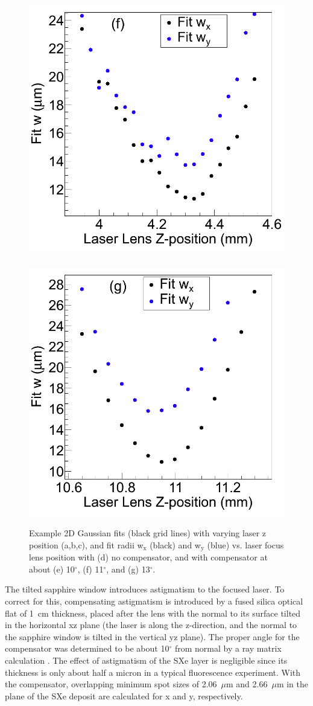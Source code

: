 \begin{figure}
                \includegraphics[width=.45\textwidth]{figures/astigcorr_curve_corr_9-16.png}
                ~
                \includegraphics[width=.45\textwidth]{figures/astigcorr_curve_corr_13deg.png}
                \caption{Example 2D Gaussian fits (black grid lines) with varying laser z position (a,b,c), and fit radii  w$_{\text{x}}$ (black) and  w$_{\text{y}}$ (blue) vs. laser focus lens position with (d) no compensator, and with compensator at about (e) 10$^{\circ}$, (f) 11$^{\circ}$, and (g) 13$^{\circ}$.}
\label{fig:astig}
\end{figure}	

The tilted sapphire window introduces astigmatism to the focused laser.  To correct for this, compensating astigmatism is introduced by a fused silica optical flat of 1~cm thickness, placed after the lens with the normal to its surface tilted in the horizontal xz plane (the laser is along the z-direction, and the normal to the sapphire window is tilted in the vertical yz plane).  The proper angle for the compensator was determined to be about 10$^{\circ}$ from normal by a ray matrix calculation \cite{raymatrix}.  The effect of astigmatism of the SXe layer is negligible since its thickness is only about half a micron in a typical fluorescence experiment.  With the compensator, overlapping minimum spot sizes of 2.06~$\mu$m and 2.66~$\mu$m in the plane of the SXe deposit are calculated for x and y, respectively.

